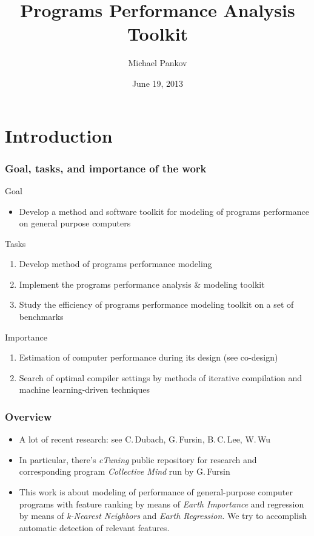 \documentclass{beamer}
\title{Programs Performance Analysis Toolkit}
\author{Michael Pankov}
\institute{Bauman Moscow State Technical University}
\date{June 19, 2013}
\begin{document}
\maketitle

\section{Introduction}

\begin{frame}
\frametitle{Goal, tasks, and importance of the work}

\begin{block}{Goal}
	\begin{itemize}
		\item Develop a method and software toolkit for modeling of programs performance on general purpose computers
	\end{itemize}
\end{block}

\begin{block}{Tasks}
	\begin{enumerate}
		\item Develop method of programs performance modeling 
		\item Implement the programs performance analysis \& modeling toolkit
		\item Study the efficiency of programs performance modeling toolkit on a set of benchmarks
	\end{enumerate}
\end{block}

\begin{block}{Importance}
	\begin{enumerate}
		\item Estimation of computer performance during its design (see co-design)
		\item Search of optimal compiler settings by methods of iterative compilation and machine learning-driven techniques
	\end{enumerate}
\end{block}

\end{frame}

\begin{frame}
\frametitle{Overview}
	
	\begin{itemize}
		\item A lot of recent research: see C.\,Dubach, G.\,Fursin, B.\,C.\,Lee, W.\,Wu
		\item In particular, there's \textit{cTuning} public repository for research and corresponding program \textit{Collective Mind} run by G.\,Fursin
		\item This work is about modeling of performance of general-purpose computer programs with feature ranking by means of \textit{Earth Importance} and regression by means of \textit{k-Nearest Neighbors} and \textit{Earth Regression}. We try to accomplish automatic detection of relevant features.
	\end{itemize}
\end{frame}
\end{document}
